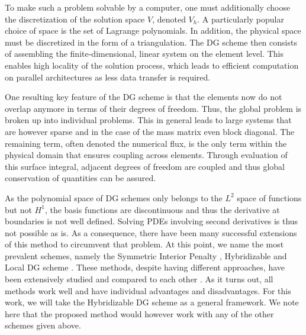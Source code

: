 \documentclass[asi,article,submit,moreauthors]{Definitions/mdpi}
\begin{document}
To make such a problem solvable by a computer, one must additionally choose the discretization of the solution space $V$, denoted $V_h$.
A particularly popular choice of space is the set of Lagrange polynomials.
In addition, the physical space must be discretized in the form of a triangulation.
The DG scheme then consists of assembling the finite-dimensional, linear system on the element level.
This enables high locality of the solution process, which leads to efficient computation on parallel architectures as less data transfer is required.

One resulting key feature of the DG scheme is that the elements now do not overlap anymore in terms of their degrees of freedom.
Thus, the global problem is broken up into individual problems.
This in general leads to large systems that are however sparse and in the case of the mass matrix even block diagonal.
The remaining term, often denoted the numerical flux, is the only term within the physical domain that ensures coupling across elements.
Through evaluation of this surface integral, adjacent degrees of freedom are coupled and thus global conservation of quantities can be assured.

As the polynomial space of DG schemes only belongs to the $L^2$ space of functions but not $H^1$, the basis functions are discontinuous and thus the derivative at boundaries is not well defined. 
Solving PDEs involving second derivatives is thus not possible as is.
As a consequence, there have been many successful extensions of this method to circumvent that problem. At this point, we name the most prevalent schemes, namely the Symmetric Interior Penalty \cite{epshteynSymmetricInteriorPenalty}, Hybridizable \cite{warburtonDiscontinuousGalerkinMethod1999} and Local DG scheme \cite{cockburnLocalDiscontinuousGalerkin1998}.
These methods, despite having different approaches, have been extensively studied and compared to each other \cite{arnoldUnifiedAnalysisDiscontinuous2002}.
As it turns out, all methods work well and have individual advantages and disadvantages.
For this work, we will take the Hybridizable DG scheme as a general framework.
We note here that the proposed method would however work with any of the other schemes given above.
\end{document}
